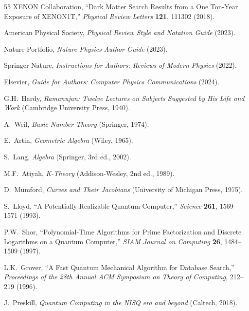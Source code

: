 \documentclass[aps,prd,preprint,superscriptaddress,showpacs,nofootinbib,longbibliography]{revtex4-2}
\begin{document}
\begin{thebibliography}{55}
XENON Collaboration,
``Dark Matter Search Results from a One Ton-Year Exposure of XENON1T,''
\textit{Physical Review Letters} \textbf{121}, 111302 (2018).


American Physical Society,
\textit{Physical Review Style and Notation Guide} (2023).

Nature Portfolio,
\textit{Nature Physics Author Guide} (2023).

Springer Nature,
\textit{Instructions for Authors: Reviews of Modern Physics} (2022).

Elsevier,
\textit{Guide for Authors: Computer Physics Communications} (2024).


G.H.~Hardy,
\textit{Ramanujan: Twelve Lectures on Subjects Suggested by His Life and Work} (Cambridge University Press, 1940).

A.~Weil,
\textit{Basic Number Theory} (Springer, 1974).

E.~Artin,
\textit{Geometric Algebra} (Wiley, 1965).

S.~Lang,
\textit{Algebra} (Springer, 3rd ed., 2002).

M.F.~Atiyah,
\textit{K-Theory} (Addison-Wesley, 2nd ed., 1989).

D.~Mumford,
\textit{Curves and Their Jacobians} (University of Michigan Press, 1975).


S.~Lloyd,
``A Potentially Realizable Quantum Computer,''
\textit{Science} \textbf{261}, 1569--1571 (1993).

P.W.~Shor,
``Polynomial-Time Algorithms for Prime Factorization and Discrete Logarithms on a Quantum Computer,''
\textit{SIAM Journal on Computing} \textbf{26}, 1484--1509 (1997).

L.K.~Grover,
``A Fast Quantum Mechanical Algorithm for Database Search,''
\textit{Proceedings of the 28th Annual ACM Symposium on Theory of Computing}, 212--219 (1996).

J.~Preskill,
\textit{Quantum Computing in the NISQ era and beyond} (Caltech, 2018).


\end{thebibliography}
\end{document}
